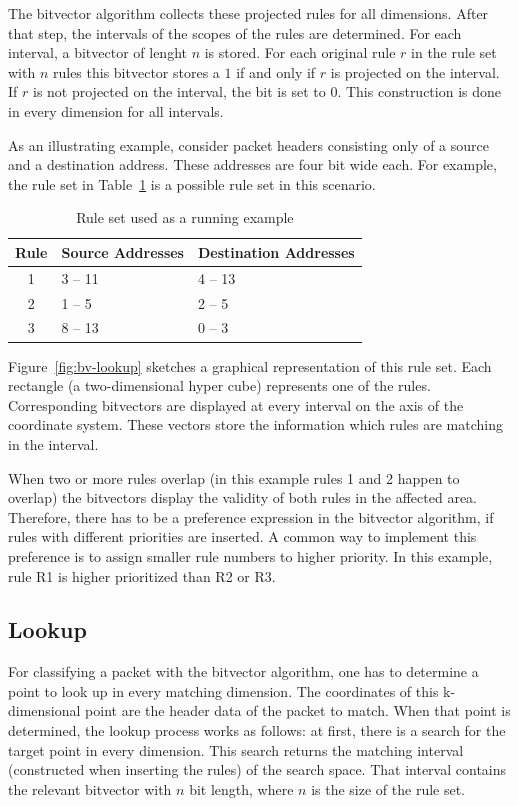 \documentclass[conference]{IEEEtran}
\begin{document}
The bitvector algorithm collects these projected rules for all dimensions.
After that step, the intervals of the scopes of the rules are determined.
For each interval, a bitvector of lenght $n$ is stored.
For each original rule $r$ in the rule set with $n$ rules this bitvector 
stores a $1$ if and only if $r$ is projected on the interval.
If $r$ is not projected on the interval, the bit is set to $0$.
This construction is done in every dimension for all intervals.

As an illustrating example, consider packet headers consisting only of a source and a destination address.
These addresses are four bit wide each.
For example, the rule set in Table~\ref{tab:rules} is a possible rule set in this scenario.

\begin{table}
\centering
  \caption{Rule set used as a running example}
  \begin{tabularx}{0.48\textwidth}{c|X|X}
  Rule&Source Addresses&Destination Addresses\\
  \hline
  1&3 -- 11&4 -- 13\\
  2&1 -- 5&2 -- 5\\
  3&8 -- 13&0 -- 3\\
  \end{tabularx}
\label{tab:rules}
\end{table}

Figure~\ref{fig:bv-lookup} sketches a graphical representation of this rule set.
Each rectangle (a two-dimensional hyper cube) represents one of the rules.
Corresponding bitvectors are displayed at every interval on the axis of the coordinate system.
These vectors store the information which rules are matching in the interval.

When two or more rules overlap (in this example rules 1 and 2 happen 
to overlap) the bitvectors display the validity of both rules in the affected area.
Therefore, there has to be a preference expression in the bitvector algorithm, 
if rules with different priorities are inserted.
A common way to implement this preference is to assign smaller rule numbers to higher priority.
In this example, rule R1 is higher prioritized than R2 or R3.

\subsection{Lookup}
For classifying a packet with the bitvector algorithm, one has to determine a point to look up in every matching dimension.
The coordinates of this k-dimensional point are the header data of the packet to match.
When that point is determined, the lookup process works as follows:
at first, there is a search for the target point in every dimension.
This search returns the matching interval (constructed when inserting the rules) of the search space.
That interval contains the relevant bitvector with $n$ bit length, where $n$ is the size of the rule set.
\end{document}
